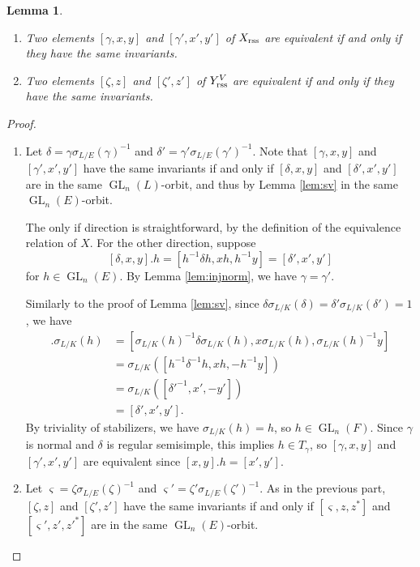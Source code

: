 \documentclass[11pt, reqno]{amsart}
\numberwithin{equation}{subsection}
\theoremstyle{plain}
\newtheorem{lem}[proposition]{Lemma}
\theoremstyle{definition}
\DeclareMathOperator{\GL}{GL}
\newcommand{\rss}{\textnormal{rss}}
\begin{document}
\begin{lem}
\label{lem:embed}
\leavevmode
\begin{enumerate}[(1)]
\item
Two elements $[\gamma, x, y]$ and $[\gamma', x', y']$
of $X_\rss$ are equivalent if and only if they
have the same invariants.

\item 
Two elements $[\zeta, z]$ and $[\zeta', z']$ of
$Y_\rss^V$ are equivalent if and only if
they have the same invariants.
\end{enumerate}
\end{lem}
\begin{proof}
\leavevmode
\begin{enumerate}[(1)]
\item
Let $\delta = \gamma\sigma_{L/E}(\gamma)^{-1}$ and
$\delta' = \gamma'\sigma_{L/E}(\gamma')^{-1}$.
Note that $[\gamma, x, y]$ and 
$[\gamma', x', y']$ have the same invariants
if and only if $[\delta, x, y]$ and
$[\delta', x', y']$ are in the same $\GL_n(L)$-orbit, 
and thus by Lemma \ref{lem:sv} in the same 
$\GL_n(E)$-orbit.

The only if direction is straightforward, by the
definition of the equivalence relation of $X$.
For the other direction, suppose 
\[
   [\delta, x, y].h = [h^{-1}\delta h, xh, h^{-1}y] =
   [\delta', x', y']
\]
for $h \in \GL_n(E)$.
By Lemma \ref{lem:injnorm}, we have $\gamma = \gamma'$.

Similarly to the proof of Lemma \ref{lem:sv}, 
since $\delta\sigma_{L/K}(\delta) 
= \delta'\sigma_{L/K}(\delta') = 1$, we have
\begin{align*}
    [\delta, x, y].\sigma_{L/K}(h) 
    &= [\sigma_{L/K}(h)^{-1} \delta \sigma_{L/K}(h), x\sigma_{L/K}(h),
    \sigma_{L/K}(h)^{-1}y]\\
    &= \sigma_{L/K}([h^{-1}\delta^{-1} h, xh, -h^{-1}y])\\
    &= \sigma_{L/K}([\delta'^{-1}, x', -y']) \\
    &= [\delta', x', y'].
\end{align*}
By triviality of stabilizers, we have $\sigma_{L/K}(h) = h$,
so $h \in \GL_n(F)$. 
Since $\gamma$ is normal and $\delta$ is regular
semisimple, this implies $h \in T_\gamma$, so
$[\gamma, x, y]$ and $[\gamma', x', y']$ are equivalent
since $[x, y].h = [x', y']$.

\item
Let $\varsigma = \zeta\sigma_{L/E}(\zeta)^{-1}$
and $\varsigma' = \zeta'\sigma_{L/E}(\zeta')^{-1}$.
As in the previous part, $[\zeta, z]$ and
$[\zeta', z']$ have the same invariants if and only
if $[\varsigma, z, z^\ast]$ and
$[\varsigma', z', z'^\ast]$ are in the same $\GL_n(E)$-orbit.


\end{enumerate}
\end{proof}
\end{document}
